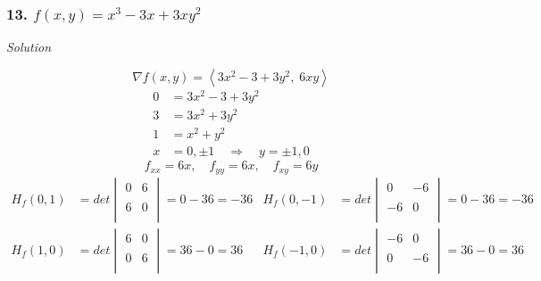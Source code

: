 \documentclass{article}
\newcommand\vv[1]{\left\langle #1 \right\rangle}
\newcommand\rr{\quad\Rightarrow\quad}
\newcommand{\solution}{\centerline{\textit{Solution}}}
\begin{document}
{\subsubsection*{13. $f(x,y)=x^3-3x+3xy^2$}
\solution
\vspace{1em}
\[
    \nabla f(x,y) = \vv{3x^2-3+3y^2,\;6xy}
\]
\begin{align*}
    0 &= 3x^2 - 3 + 3y^2 \\
    3 &= 3x^2 + 3y^2 \\
    1 &= x^2 + y^2 \\
    x &= 0, \pm 1 \rr y = \pm 1, 0
\end{align*}
\[
    f_{xx} = 6x,\quad f_{yy} = 6x,\quad f_{xy} = 6y
\]
\begin{align*}
    H_f(0, 1) &= det\begin{vmatrix}
    0 & 6 \\\\
    6 & 0 \\
\end{vmatrix} = 0-36=-36 &
    H_f(0, -1) &= det\begin{vmatrix}
    0 & -6 \\\\
    -6 & 0 \\
    \end{vmatrix} = 0-36=-36 \\
    H_f(1, 0) &= det\begin{vmatrix}
    6 & 0 \\\\
    0 & 6 \\
\end{vmatrix} = 36-0=36 &
    H_f(-1, 0) &= det\begin{vmatrix}
    -6 & 0 \\\\
    0 & -6 \\
    \end{vmatrix} = 36-0=36 \\
\end{align*}
\\
\\
\\\\
\\
\\
\newpage
}
\end{document}
